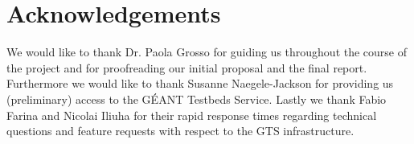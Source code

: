 \thispagestyle{acknowledgements}
\section*{Acknowledgements}
We would like to thank Dr. Paola Grosso for guiding us throughout the course of the project and for proofreading our initial proposal and the final report. Furthermore we would like to thank Susanne Naegele-Jackson for providing us (preliminary) access to the GÉANT Testbeds Service. Lastly we thank Fabio Farina and Nicolai Iliuha for their rapid response times regarding technical questions and feature requests with respect to the GTS infrastructure. 